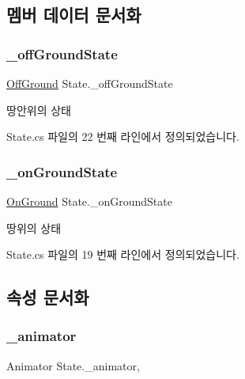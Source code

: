 \subsection{멤버 데이터 문서화}
\mbox{\label{class_state_ad421039bfc35b46969f174c9617ab786}} 
\subsubsection{\texorpdfstring{\_offGroundState}{\_offGroundState}}
{\footnotesize\ttfamily \mbox{\hyperlink{class_state_a7d945e793324c017a973205564cf1a56}{Off\+Ground}} State.\+\_\+off\+Ground\+State}



땅안위의 상태 



State.\+cs 파일의 22 번째 라인에서 정의되었습니다.

\mbox{\label{class_state_ab3170df5e58f541f39edff3c1278d443}} 
\subsubsection{\texorpdfstring{\_onGroundState}{\_onGroundState}}
{\footnotesize\ttfamily \mbox{\hyperlink{class_state_ab9eb1c1d81f1903b8486d1275e78b68e}{On\+Ground}} State.\+\_\+on\+Ground\+State}



땅위의 상태 



State.\+cs 파일의 19 번째 라인에서 정의되었습니다.



\subsection{속성 문서화}
\mbox{\label{class_state_aff1dd03a1b3c63053b23371d6d70cd1a}} 
\subsubsection{\texorpdfstring{\_animator}{\_animator}}
{\footnotesize\ttfamily Animator State.\+\_\+animator\hspace{0.3cm}{\ttfamily [get]}, {\ttfamily [set]}}



